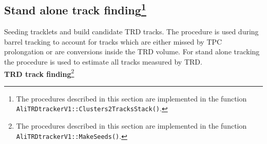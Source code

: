 \documentclass{alicetdr}
\begin{document}
\subsection[Stand alone track finding]{Stand alone track finding\footnote{The procedures
described in this section are implemented in the function
{\tt AliTRDtrackerV1::Clusters2TracksStack()}.}}\label{REC:Tracking:Clusters2TracksStack}

Seeding tracklets and build candidate TRD tracks. The procedure is used during
barrel tracking to account for tracks which are either missed by TPC prolongation
or are conversions inside the TRD volume. For stand alone tracking the procedure
is used to estimate all tracks measured by TRD.
\\

\noindent
{\bf TRD track finding}\footnote{The procedures described in this section
are implemented in the function {\tt AliTRDtrackerV1::MakeSeeds()}.}
\\
\end{document}
